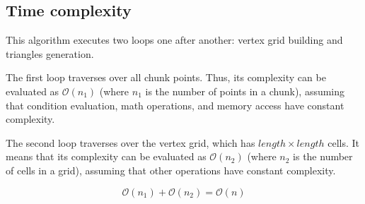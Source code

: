 \subsection{Time complexity}

This algorithm executes two loops one after another: vertex grid building and triangles generation.

The first loop traverses over all chunk points. Thus, its complexity can be evaluated as $\mathcal{O}(n_1)$ (where $n_1$ is the number of points in a chunk), assuming that condition evaluation, math operations, and memory access have constant complexity.

The second loop traverses over the vertex grid, which has $length \times length$ cells. It means that its complexity can be evaluated as $\mathcal{O}(n_2)$ (where $n_2$ is the number of cells in a grid), assuming that other operations have constant complexity.

$$\mathcal{O}(n_1) + \mathcal{O}(n_2) = \mathcal{O}(n)$$

